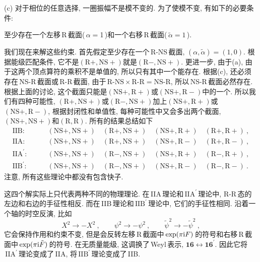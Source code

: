 \noindent (c) 对于相位的任意选择, 一圈振幅不是模不变的. 为了使模不变, 有如下的必要条件:

\noindent \quad\: 至少存在一个左移\,R\,截面(\,$\alpha=$1\,)和一个右移\,R\,截面(\,$\tilde{\alpha}=1$\,).

我们现在来解这些约束. 首先假定至少存在一个\,R-NS\,截面, $(\alpha,\tilde{\alpha})=(1,0)$. 根据能级匹配条件, 它不是$(\text{R}+,\text{NS}+)$就是$(\text{R}-,\text{NS}+)$. 更进一步, 由于(a), 由于这两个顶点算符的乘积不是单值的, 所以只有其中一个能存在. 根据(c), 还必须存在\,NS-R\,截面或\,R-R\,截面, 由于$\,\text{R-NS}\times \text{R-R}=\text{NS-R}$, 所以\,NS-R\,截面必然存在. 根据上面的讨论, 这个截面只能是$(\text{NS}+,\text{R}+)$或$(\text{NS}+,\text{R}-)$中的一个. 所以我们有四种可能性,  $(\text{R}+,\text{NS}+)$或$(\text{R}-,\text{NS}+)$加上$(\text{NS}+,\text{R}+)$或$(\text{NS}+,\text{R}-)$, 根据封闭性和单值性, 每种可能性中又会多出两个截面, $(\text{NS}+,\text{NS}+)$和$(\text{R},\text{R})$. 所有的结果总结如下
\begin{align*}
    \text{IIB}:&\qquad (\text{NS}+,\text{NS}+)\quad (\text{R}+,\text{NS}+)\quad (\text{NS}+,\text{R}+)\quad (\text{R}+,\text{R}+) \:, \\
    \text{IIA}:&\qquad (\text{NS}+,\text{NS}+)\quad (\text{R}+,\text{NS}+)\quad (\text{NS}+,\text{R}-)\quad (\text{R}+,\text{R}-) \:, \\
    \text{IIA}^{\prime}:&\qquad (\text{NS}+,\text{NS}+)\quad (\text{R}-,\text{NS}+)\quad (\text{NS}+,\text{R}+)\quad (\text{R}-,\text{R}+) \:, \\
    \text{IIB}^{\prime}:& \qquad (\text{NS}+,\text{NS}+)\quad (\text{R}-,\text{NS}+)\quad (\text{NS}+,\text{R}-)\quad (\text{R}-,\text{R}-) \:. 
\end{align*}
注意, 所有这些理论中都没有包含快子.

这四个解实际上只代表两种不同的物理理论. 在\,IIA\,理论和$\,\text{IIA}^{\prime}\,$理论中, R-R\,态的左边和右边的手征性相反. 而在\,IIB\,理论和$\,\text{IIB}^{\prime}\,$理论中, 它们的手征性相同. 沿着一个轴的时空反演, 比如
\begin{equation}
    X^{2}\to-X^{2}\:,\qquad \psi^{2}\to -\psi^{2} \:, \qquad \tilde{\psi}^{2}\to -\tilde{\psi}^{2} \:,\label{10.6.7} 
\end{equation}
它会保持作用和约束不变, 但是会反转左移\,R\,截面中$\,\exp(\pi\mathrm{i} F)\,$的符号和右移\,R\,截面中$\,\exp(\pi\mathrm{i} \tilde{F})\,$的符号. 在无质量能级, 这调换了\,Weyl\,表示, $\mathbf{16}\leftrightarrow \mathbf{16}^{\prime}$. 因此它将$\,\text{IIA}^{\prime}\,$理论变成了\,IIA, 将$\,\text{IIB}^{\prime}\,$理论变成了\,IIB.

